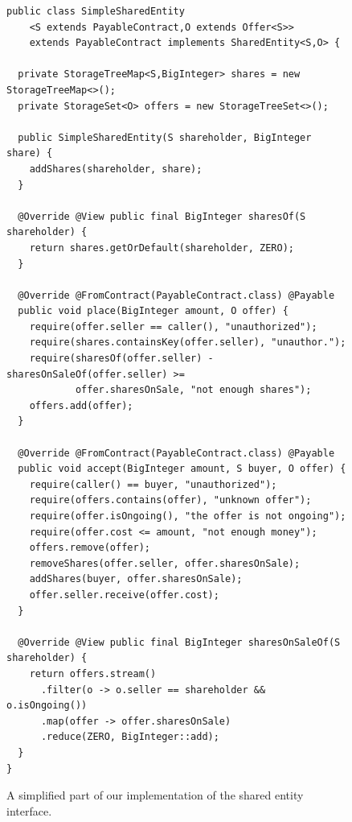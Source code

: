 \begin{figure}[tp]
  \begin{center}
    \begin{lstlisting}[language=Takamaka]
public class SimpleSharedEntity
    <S extends PayableContract,O extends Offer<S>>
    extends PayableContract implements SharedEntity<S,O> {

  private StorageTreeMap<S,BigInteger> shares = new StorageTreeMap<>();
  private StorageSet<O> offers = new StorageTreeSet<>();

  public SimpleSharedEntity(S shareholder, BigInteger share) {
    addShares(shareholder, share);
  }

  @Override @View public final BigInteger sharesOf(S shareholder) {
    return shares.getOrDefault(shareholder, ZERO);
  }

  @Override @FromContract(PayableContract.class) @Payable
  public void place(BigInteger amount, O offer) {
    require(offer.seller == caller(), "unauthorized");
    require(shares.containsKey(offer.seller), "unauthor.");
    require(sharesOf(offer.seller) - sharesOnSaleOf(offer.seller) >= 
            offer.sharesOnSale, "not enough shares");
    offers.add(offer);
  }

  @Override @FromContract(PayableContract.class) @Payable
  public void accept(BigInteger amount, S buyer, O offer) {
    require(caller() == buyer, "unauthorized");
    require(offers.contains(offer), "unknown offer");
    require(offer.isOngoing(), "the offer is not ongoing");
    require(offer.cost <= amount, "not enough money");
    offers.remove(offer);
    removeShares(offer.seller, offer.sharesOnSale);
    addShares(buyer, offer.sharesOnSale);
    offer.seller.receive(offer.cost);
  }

  @Override @View public final BigInteger sharesOnSaleOf(S shareholder) {
    return offers.stream()
      .filter(o -> o.seller == shareholder && o.isOngoing())
      .map(offer -> offer.sharesOnSale)
      .reduce(ZERO, BigInteger::add);
  }
}
    \end{lstlisting}
  \end{center}
  \caption{A simplified part of our implementation of the shared entity interface.}\label{fig:simple_shared_entity}
\end{figure}

